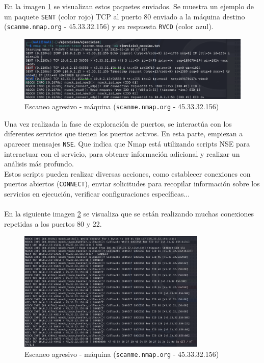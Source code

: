 \documentclass[a4paper,12pt]{article} %
\begin{document}
    En la imagen \ref{fig:ejer3Sent} se visualizan estos paquetes enviados. Se muestra un ejemplo de un paquete \texttt{SENT} (color rojo) TCP al puerto 80 enviado a la máquina destino (\texttt{scanme.nmap.org} - 45.33.32.156) y su respuesta \texttt{RVCD} (color azul). 
    
        \begin{figure} [hp!]
         \centering
         \includegraphics[width=1\textwidth]{Imagenes/ejer3_2SENT.png}
         \caption{Escaneo agresivo - máquina (\texttt{scanme.nmap.org} - 45.33.32.156) }
         \label{fig:ejer3Sent}
        \end{figure}

    Una vez realizada la fase de exploración de puertos, se interactúa con los diferentes servicios que tienen los puertos activos. En esta parte, empiezan a aparecer mensajes \texttt{NSE}. Que indica que Nmap está utilizando scripts NSE para interactuar con el servicio, para obtener información adicional y realizar un análisis más profundo. 
    \\
    Estos scripts pueden realizar diversas acciones, como establecer conexiones con puertos abiertos (\texttt{CONNECT}), enviar solicitudes para recopilar información sobre los servicios en ejecución, verificar configuraciones específicas...
\\ \\
    En la siguiente imagen \ref{fig:puerto80} se visualiza que se están realizando muchas conexiones repetidas a los puertos 80 y 22. 

\newpage
        \begin{figure} [hp!]
         \centering
         \includegraphics[width=0.8\textwidth]{Imagenes/puerto80Connect.png}
         \caption{Escaneo agresivo - máquina (\texttt{scanme.nmap.org} - 45.33.32.156) }
         \label{fig:puerto80}
        \end{figure}
\end{document}
